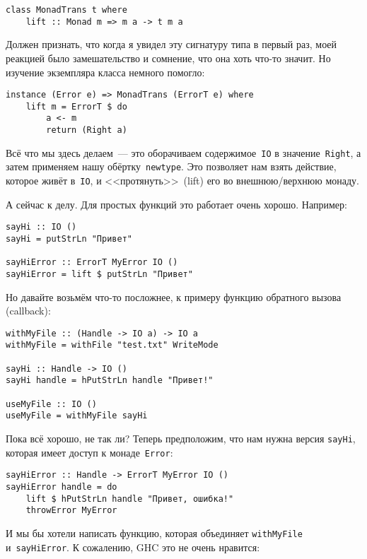 \begin{lstlisting}
class MonadTrans t where
    lift :: Monad m => m a -> t m a
\end{lstlisting}

Должен признать, что когда я увидел эту сигнатуру типа в первый раз, моей
реакцией было замешательство и сомнение, что она хоть что-то значит. Но
изучение экземпляра класса немного помогло:

\begin{lstlisting}
instance (Error e) => MonadTrans (ErrorT e) where
    lift m = ErrorT $ do
        a <- m
        return (Right a)
\end{lstlisting}%

Всё что мы здесь делаем~--- это оборачиваем содержимое~\lstinline'IO' в
значение~\lstinline'Right', а затем применяем нашу обёртку~\lstinline'newtype'.
Это позволяет нам взять действие, которое живёт в~\lstinline'IO', и
<<протянуть>>~(lift) его во внешнюю/верхнюю монаду.

А сейчас к делу. Для простых функций это работает очень хорошо. Например:

\begin{lstlisting}
sayHi :: IO ()
sayHi = putStrLn "Привет"

sayHiError :: ErrorT MyError IO ()
sayHiError = lift $ putStrLn "Привет"
\end{lstlisting}

Но давайте возьмём что-то посложнее, к примеру функцию обратного вызова
(callback):

\begin{lstlisting}
withMyFile :: (Handle -> IO a) -> IO a
withMyFile = withFile "test.txt" WriteMode

sayHi :: Handle -> IO ()
sayHi handle = hPutStrLn handle "Привет!"

useMyFile :: IO ()
useMyFile = withMyFile sayHi
\end{lstlisting}

Пока всё хорошо, не так ли? Теперь предположим, что нам нужна версия
\lstinline'sayHi', которая имеет доступ к монаде~\lstinline'Error':

\begin{lstlisting}
sayHiError :: Handle -> ErrorT MyError IO ()
sayHiError handle = do
    lift $ hPutStrLn handle "Привет, ошибка!"
    throwError MyError
\end{lstlisting}

И мы бы хотели написать функцию, которая объединяет \lstinline'withMyFile'
и~\lstinline'sayHiError'. К сожалению, GHC это не очень нравится:

